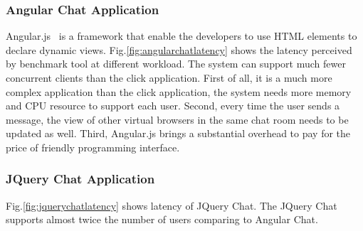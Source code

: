 
\appinstancefig{}



\subsubsection{Angular Chat Application}
\label{sec:angular}
Angular.js~\cite{angular} is a \js{} framework that enable the developers to 
use HTML elements to declare dynamic views.
Fig.\ref{fig:angularchatlatency} shows the latency perceived by benchmark tool
at different workload.
The system can support much fewer concurrent clients than the click application.
First of all, it is a much more complex application than the click application,
the system needs more memory and CPU resource to support each user.
Second, every time the user sends a message, the view of other virtual browsers
in the same chat room needs to be updated as well.
Third, Angular.js brings a substantial overhead 
to pay for the price of friendly programming interface.

\angularchatlatency{}

\subsubsection{JQuery Chat Application}
\label{sec:jquery}
Fig.\ref{fig:jquerychatlatency} shows latency of JQuery Chat.
The JQuery Chat supports almost twice the number of users comparing to Angular Chat.


\jquerychatlatency{}